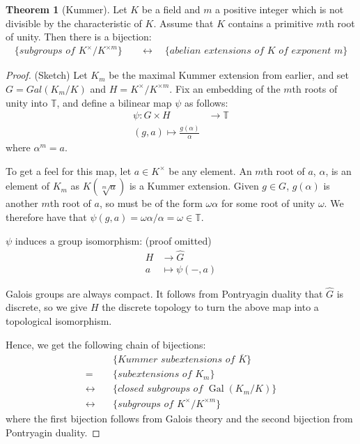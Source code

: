 \documentclass[12pt, a4paper]{article}
\theoremstyle{definition}
\newtheorem{theorem}{Theorem}[section]
\DeclareMathOperator{\Gal}{Gal}
\begin{document}
\begin{theorem}[Kummer]
Let $K$ be a field and $m$ a positive integer which is not divisible by the characteristic of $K$. Assume that $K$ contains a primitive $m$th
root of unity. Then there is a bijection:
\begin{align*}
\{\textit{subgroups of } K^\times / K^{\times m}\} \quad &\longleftrightarrow \quad \{\textit{abelian extensions of } K \textit{ of exponent } m\} %
\end{align*}
\end{theorem}
\begin{proof}(Sketch)
Let $K_m$ be the maximal Kummer extension from earlier, and set $G = Gal(K_m/K)$ and $H = K^\times / K^{\times m}$. Fix an embedding of the $m$th roots of unity into $\mathbb{T}$, and define a bilinear map $\psi$ as follows:
\begin{align*}
\psi : G \times H &\to \mathbb{T} \\
(g, a) \mapsto \frac{g(\alpha)}{\alpha}
\end{align*}
where $\alpha^m = a$.

To get a feel for this map, let $a \in K^\times$ be any element. An $m$th root of $a$, $\alpha$, is an element of $K_m$ as $K( \sqrt[m]{a} )$ is a Kummer extension. Given $g \in G$, $g(\alpha)$ is another $m$th root of $a$, so must be of the form $\omega \alpha$ for some root of unity $\omega$. We therefore have that $\psi(g, a) = \omega \alpha / \alpha = \omega \in \mathbb{T}$.

$\psi$ induces a group isomorphism: (proof omitted)
\begin{align*}
H &\to \widehat{G}\\
a &\mapsto \psi(-,a)
\end{align*}

Galois groups are always compact. It follows from Pontryagin duality that $\widehat{G}$ is discrete, so we give $H$ the discrete topology to turn the above map into a topological isomorphism.

Hence, we get the following chain of bijections:
\begin{align*}
& \{\textit{Kummer subextensions of } \overline{K}\} \\ 
= \quad & \{\textit{subextensions of } K_m\} \\
\longleftrightarrow \quad &\{\textit{closed subgroups of } \Gal(K_m/K)\}\\
\longleftrightarrow \quad &\{\textit{subgroups of } K^\times / K^{\times m}\}
\end{align*}
where the first bijection follows from Galois theory and the second bijection from Pontryagin duality.
\end{proof}

\printbibliography
\end{document}
